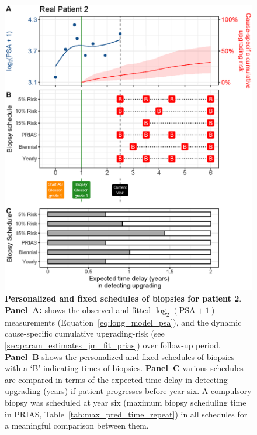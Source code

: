 \begin{figure}
\centerline{\includegraphics[width=\columnwidth]{images/demo_pat2_supp.eps}}
\caption{\textbf{Personalized and fixed schedules of biopsies for patient 2}. \textbf{Panel~A:} shows the observed and fitted $\log_2(\mbox{PSA} + 1)$ measurements (Equation~\ref{eq:long_model_psa}), and the dynamic cause-specific cumulative upgrading-risk (see \ref{sec:param_estimates_jm_fit_prias}) over follow-up period. \textbf{Panel~B} shows the personalized and fixed schedules of biopsies with a `B' indicating times of biopsies. \textbf{Panel~C} various schedules are compared in terms of the expected time delay in detecting upgrading (years) if patient progresses before year six. A compulsory biopsy was scheduled at year six (maximum biopsy scheduling time in PRIAS, Table~\ref{tab:max_pred_time_repeat}) in all schedules for a meaningful comparison between them.}
\label{fig:demo_pat2_supp}
\end{figure}

